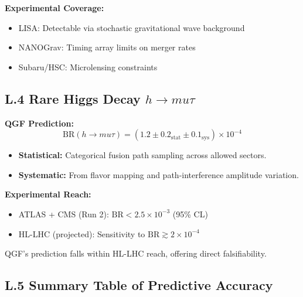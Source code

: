 \documentclass[11pt]{article}
\def\mu{mu}
\begin{document}
\textbf{Experimental Coverage:}
\begin{itemize}
\item LISA: Detectable via stochastic gravitational wave background \cite{LISA2022}
\item NANOGrav: Timing array limits on merger rates \cite{NANOGrav2023}
\item Subaru/HSC: Microlensing constraints \cite{Niikura2019}
\end{itemize}

\subsection*{L.4 Rare Higgs Decay \( h \to \mu\tau \)}

\textbf{QGF Prediction:}
\[
\mathrm{BR}(h \to \mu\tau) = (1.2 \pm 0.2_{\mathrm{stat}} \pm 0.1_{\mathrm{sys}}) \times 10^{-4}
\]

\begin{itemize}
\item \textbf{Statistical:} Categorical fusion path sampling across allowed sectors.
\item \textbf{Systematic:} From flavor mapping and path-interference amplitude variation.
\end{itemize}

\textbf{Experimental Reach:}
\begin{itemize}
\item ATLAS + CMS (Run 2): \( \mathrm{BR} < 2.5 \times 10^{-3} \) (95\% CL) \cite{CMSATLAS2020}
\item HL-LHC (projected): Sensitivity to \( \mathrm{BR} \gtrsim 2 \times 10^{-4} \) \cite{HLLHC2021}
\end{itemize}

QGF’s prediction falls within HL-LHC reach, offering direct falsifiability.

\subsection*{L.5 Summary Table of Predictive Accuracy}
\end{document}
